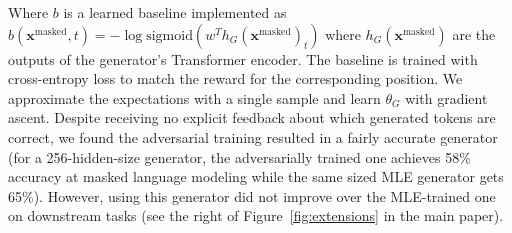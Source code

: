 \documentclass{article}
\newcommand{\bmx}{\bm{x}^\text{masked}}
\begin{document}
Where $b$ is a learned baseline implemented as $b(\bmx, t) = -\log \text{sigmoid}(w^T h_G(\bmx)_t)$ 
where $h_G(\bmx)$ are the outputs of the generator's Transformer encoder.
The baseline is trained with cross-entropy loss to match the reward for the corresponding position.
We approximate the expectations with a single sample and learn $\theta_G$ with gradient ascent.
Despite receiving no explicit feedback about which generated tokens are correct, we found the adversarial training resulted in a fairly accurate generator (for a 256-hidden-size generator, the adversarially trained one achieves 58\% accuracy at masked language modeling while the same sized MLE generator gets 65\%).
However, using this generator did not improve over the MLE-trained one on downstream tasks (see the right of Figure~\ref{fig:extensions} in the main paper).
\end{document}
